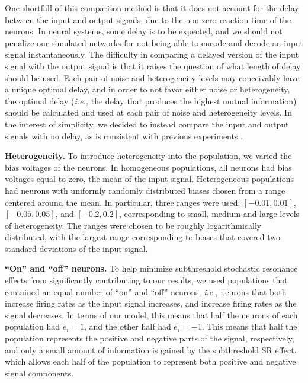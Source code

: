 \documentclass[12pt]{article}
\begin{document}
One shortfall of this comparison method is that it does not account for the delay between the input and output signals, due to the non-zero reaction time of the neurons. In neural systems, some delay is to be expected, and we should not penalize our simulated networks for not being able to encode and decode an input signal instantaneously. The difficulty in comparing a delayed version of the input signal with the output signal is that it raises the question of what length of delay should be used. Each pair of noise and heterogeneity levels may conceivably have a unique optimal delay, and in order to not favor either noise or heterogeneity, the optimal delay (\emph{i.e.,} the delay that produces the highest mutual information) should be calculated and used at each pair of noise and heterogeneity levels. In the interest of simplicity, we decided to instead compare the input and output signals with no delay, as is consistent with previous experiments \citep{Stocks2001}.

\textbf{Heterogeneity.} To introduce heterogeneity into the population, we varied the bias voltages of the neurons. In homogeneous populations, all neurons had bias voltages equal to zero, the mean of the input signal. Heterogeneous populations had neurons with uniformly randomly distributed biases chosen from a range centered around the mean. In particular, three ranges were used: $[-0.01,0.01]$, $[-0.05,0.05]$, and $[-0.2,0.2]$, corresponding to small, medium and large levels of heterogeneity. The ranges were chosen to be roughly logarithmically distributed, with the largest range corresponding to biases that covered two standard deviations of the input signal.

\textbf{``On'' and ``off'' neurons.} To help minimize subthreshold stochastic resonance effects from significantly contributing to our results, we used populations that contained an equal number of ``on'' and ``off'' neurons, \emph{i.e.,} neurons that both increase firing rates as the input signal increases, and increase firing rates as the signal decreases. In terms of our model, this means that half the neurons of each population had $e_i = 1$, and the other half had $e_i = -1$. This means that half the population represents the positive and negative parts of the signal, respectively, and only a small amount of information is gained by the subthreshold SR effect, which allows each half of the population to represent both positive and negative signal components.
\end{document}
